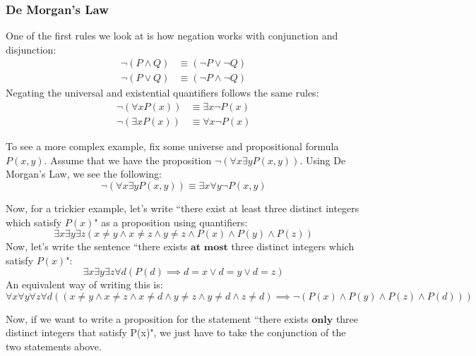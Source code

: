 \documentclass[openany]{book}
\begin{document}
\subsubsection{De Morgan's Law} One of the first rules we look at is how negation works with conjunction and disjunction:
\begin{align*}
	\neg (P \land Q) &\equiv (\neg P \lor \neg Q) \\
	\neg (P \lor Q) &\equiv (\neg P \land \neg Q)
\end{align*}
Negating the universal and existential quantifiers follows the same rules:
\begin{align*}
	\neg (\forall x P(x)) &\equiv \exists x \neg P(x) \\
	\neg (\exists x P(x)) &\equiv \forall x \neg P(x)
\end{align*}
\begin{example}
	To see a more complex example, fix some universe and propositional formula $P(x,y)$. Assume that we have the proposition $\neg (\forall x \exists y P(x,y))$. Using De Morgan's Law, we see the following:
	\begin{equation*}
		\neg (\forall x \exists y P(x,y)) \equiv \exists x \forall y \neg P(x,y)
	\end{equation*}
\end{example}
\begin{example}
	Now, for a trickier example, let's write ``there exist at least three distinct integers which satisfy $P(x)$" as a proposition using quantifiers:
	\begin{equation*}
		\exists x \exists y \exists z (x \neq y \land x\neq z \land y\neq z \land P(x) \land P(y) \land P(z))
	\end{equation*}
	Now, let's write the sentence ``there exists $\textbf{at most}$ three distinct integers which satisfy $P(x)$":
	\begin{equation*}
		\exists x \exists y \exists z \forall d (P(d) \implies d=x \lor d=y \lor d=z)
	\end{equation*}
	An equivalent way of writing this is:
	\begin{equation*}
		\forall x \forall y \forall z \forall d((x \neq y \land x \neq z \land x\neq d \land y\neq z \land y\neq d \land z\neq d) \implies \neg (P(x) \land P(y) \land P(z) \land P(d)))
	\end{equation*}
\end{example}
Now, if we want to write a proposition for the statement ``there exists $\textbf{only}$ three distinct integers that satisfy P(x)", we just have to take the conjunction of the two statements above.
\end{document}
